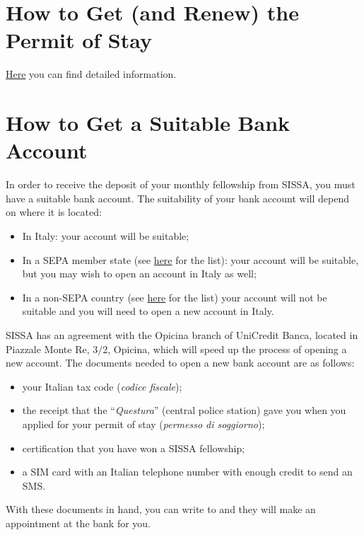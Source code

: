 \documentclass{sissavademecum}
\begin{document}
\section{How to Get (and Renew) the Permit of Stay}

\href{http://wiki.sissa.it/students/index.php/Permit_of_stay}{Here} you can find detailed information.


\section{How to Get a Suitable Bank Account}

In order to receive the deposit of your monthly fellowship from SISSA, you must have a suitable bank account. The suitability of your bank account will depend on where it is located:
\begin{itemize}
    \item In Italy: your account will be suitable;
    \item In a SEPA member state (see \href{http://www.sepaitalia.eu/welcome.asp?Page=2389&chardim=0&a=a&langid=1}{here} for the list): your account will be suitable, but you may wish to open an account in Italy as well;
    \item In a non-SEPA country (see \href{http://www.sepaitalia.eu/welcome.asp?Page=2389&chardim=0&a=a&langid=1}{here} for the list) your account will not be suitable and you will need to open a new account in Italy.
\end{itemize}

SISSA has an agreement with the Opicina branch of UniCredit Banca, located in Piazzale Monte Re, $3/2$, Opicina, which will speed up the process of opening a new account. The documents needed to open a new bank account are as follows:
\begin{itemize}
    \item your Italian tax code (\textit{codice fiscale});
    \item the receipt that the ``\textit{Questura}'' (central police station) gave you when you applied for your permit of stay (\textit{permesso di soggiorno});
    \item certification that you have won a SISSA fellowship;
    \item a SIM card with an Italian telephone number with enough credit to send an SMS.
\end{itemize}

With these documents in hand, you can write to  and they will make an appointment at the bank for you.
\end{document}
